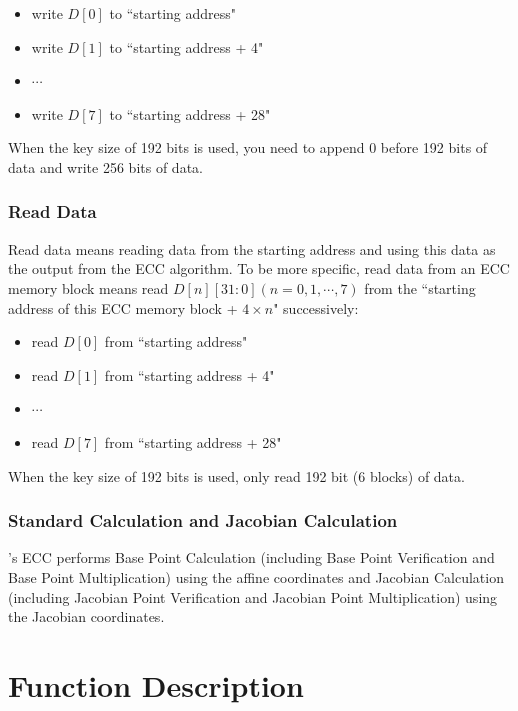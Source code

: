 \documentclass[main\_\_EN.tex]{subfiles}
\begin{document}
\begin{itemize}
    \item write $D[0]$ to ``starting address"
    \item write $D[1]$ to ``starting address + 4"
    \item $\cdots$
    \item write $D[7]$ to ``starting address + 28"
\end{itemize}

\begin{tiplisting}
When the key size of 192 bits is used, you need to append 0 before 192 bits of data and write 256 bits of data.
\end{tiplisting}

\subsubsection{Read Data}

Read data means reading data from the starting address and using this data as the output from the ECC algorithm. To be more specific, read data from an ECC memory block means read $D[n][31:0] (n=0, 1, \cdots, 7)$ from the ``starting address of this ECC memory block +
$4 \times n$" successively:
\begin{itemize}
    \item read $D[0]$ from ``starting address"
    \item read $D[1]$ from ``starting address + 4"
    \item $\cdots$
    \item read $D[7]$ from ``starting address + 28"
\end{itemize}

\begin{tiplisting}
When the key size of 192 bits is used, only read 192 bit (6 blocks) of data.
\end{tiplisting}


\subsubsection{Standard Calculation and Jacobian Calculation}

\chipname{}'s ECC performs Base Point Calculation (including Base Point Verification and Base Point Multiplication) using the affine coordinates and Jacobian Calculation (including Jacobian Point Verification and Jacobian Point Multiplication) using the Jacobian coordinates.

\section{Function Description}
\label{sec:ecc-mode-config}
\end{document}

